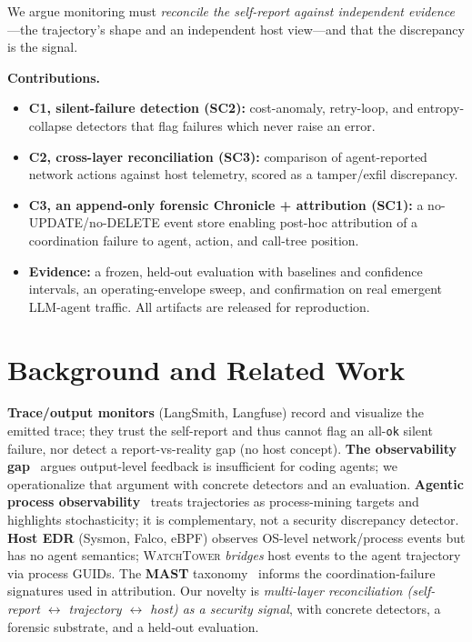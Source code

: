 \documentclass[conference]{IEEEtran}
\begin{document}
We argue monitoring must \emph{reconcile the self-report against independent evidence}---the
trajectory's shape and an independent host view---and that the discrepancy is the signal.

\noindent\textbf{Contributions.}
\begin{itemize}
\item \textbf{C1, silent-failure detection (SC2):} cost-anomaly, retry-loop, and
entropy-collapse detectors that flag failures which never raise an error.
\item \textbf{C2, cross-layer reconciliation (SC3):} comparison of agent-reported network
actions against host telemetry, scored as a tamper/exfil discrepancy.
\item \textbf{C3, an append-only forensic Chronicle + attribution (SC1):} a no-UPDATE/no-DELETE
event store enabling post-hoc attribution of a coordination failure to agent, action, and
call-tree position.
\item \textbf{Evidence:} a frozen, held-out evaluation with baselines and confidence intervals,
an operating-envelope sweep, and confirmation on real emergent LLM-agent traffic. All artifacts
are released for reproduction.
\end{itemize}

\section{Background and Related Work}
\textbf{Trace/output monitors} (LangSmith, Langfuse) record and visualize the emitted trace;
they trust the self-report and thus cannot flag an all-\texttt{ok} silent failure, nor detect a
report-vs-reality gap (no host concept). \textbf{The observability gap}~\cite{obsgap} argues
output-level feedback is insufficient for coding agents; we operationalize that argument with
concrete detectors and an evaluation. \textbf{Agentic process observability}~\cite{procobs}
treats trajectories as process-mining targets and highlights stochasticity; it is complementary,
not a security discrepancy detector. \textbf{Host EDR} (Sysmon, Falco, eBPF) observes OS-level
network/process events but has no agent semantics; \textsc{WatchTower} \emph{bridges} host events
to the agent trajectory via process GUIDs. The \textbf{MAST} taxonomy~\cite{mast} informs the
coordination-failure signatures used in attribution. Our novelty is \emph{multi-layer
reconciliation (self-report $\leftrightarrow$ trajectory $\leftrightarrow$ host) as a security
signal}, with concrete detectors, a forensic substrate, and a held-out evaluation.
\end{document}
